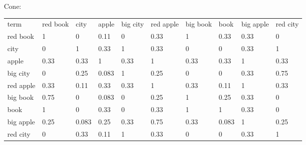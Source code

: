 \documentclass{article}
\begin{document}
Cone:

\begin{tabular}{llllllllll}
term & red book &  city &  apple & big city & red apple & big book &  book & big apple & red city\\ 
red book & 1 & 0 & 0.11 & 0 & 0.33 & 1 & 0.33 & 0.33 & 0\\ 
 city & 0 & 1 & 0.33 & 1 & 0.33 & 0 & 0 & 0.33 & 1\\ 
 apple & 0.33 & 0.33 & 1 & 0.33 & 1 & 0.33 & 0.33 & 1 & 0.33\\ 
big city & 0 & 0.25 & 0.083 & 1 & 0.25 & 0 & 0 & 0.33 & 0.75\\ 
red apple & 0.33 & 0.11 & 0.33 & 0.33 & 1 & 0.33 & 0.11 & 1 & 0.33\\ 
big book & 0.75 & 0 & 0.083 & 0 & 0.25 & 1 & 0.25 & 0.33 & 0\\ 
 book & 1 & 0 & 0.33 & 0 & 0.33 & 1 & 1 & 0.33 & 0\\ 
big apple & 0.25 & 0.083 & 0.25 & 0.33 & 0.75 & 0.33 & 0.083 & 1 & 0.25\\ 
red city & 0 & 0.33 & 0.11 & 1 & 0.33 & 0 & 0 & 0.33 & 1\\ 
\end{tabular}




\end{document}
